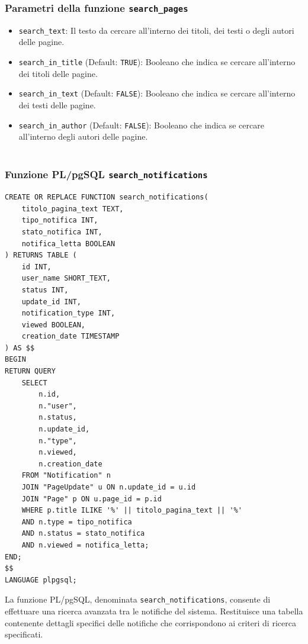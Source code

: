 \documentclass{article}
\begin{document}
\subsubsection{Parametri della funzione \texttt{search\_pages}}	
	\begin{itemize}
		\item \texttt{search\_text}: Il testo da cercare all'interno dei titoli, dei testi o degli autori delle pagine.
		\item \texttt{search\_in\_title} (Default: \texttt{TRUE}): Booleano che indica se cercare all'interno dei titoli delle pagine.
		\item \texttt{search\_in\_text} (Default: \texttt{FALSE}): Booleano che indica se cercare all'interno dei testi delle pagine.
		\item \texttt{search\_in\_author} (Default: \texttt{FALSE}): Booleano che indica se cercare all'interno degli autori delle pagine.
		\\\\
	\end{itemize}
	

	
\subsubsection{Funzione PL/pgSQL \texttt{search\_notifications}}
	
	
\begin{lstlisting}[style=SQL]
CREATE OR REPLACE FUNCTION search_notifications(
	titolo_pagina_text TEXT,
	tipo_notifica INT,
	stato_notifica INT,
	notifica_letta BOOLEAN
) RETURNS TABLE (
	id INT,
	user_name SHORT_TEXT,
	status INT,
	update_id INT,
	notification_type INT,
	viewed BOOLEAN,
	creation_date TIMESTAMP
) AS $$
BEGIN
RETURN QUERY
	SELECT 
		n.id,
		n."user",
		n.status,
		n.update_id,
		n."type",
		n.viewed,
		n.creation_date
	FROM "Notification" n
	JOIN "PageUpdate" u ON n.update_id = u.id
	JOIN "Page" p ON u.page_id = p.id
	WHERE p.title ILIKE '%' || titolo_pagina_text || '%'
	AND n.type = tipo_notifica
	AND n.status = stato_notifica
	AND n.viewed = notifica_letta;
END;
$$
LANGUAGE plpgsql;
\end{lstlisting}
La funzione PL/pgSQL, denominata \texttt{search\_notifications}, consente di effettuare una ricerca avanzata tra le notifiche del sistema. Restituisce una tabella contenente dettagli specifici delle notifiche che corrispondono ai criteri di ricerca specificati.
\\
    
\end{document}
